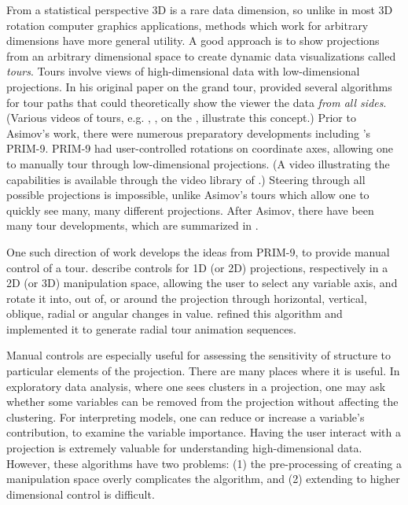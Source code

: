 \documentclass[]{interact}
\theoremstyle{plain}%
\theoremstyle{definition}
\theoremstyle{remark}
\begin{document}
From a statistical perspective 3D is a rare data dimension, so unlike in
most 3D rotation computer graphics applications, methods which work for
arbitrary dimensions have more general utility. A good approach is to
show projections from an arbitrary dimensional space to create dynamic
data visualizations called \emph{tours}. Tours involve views of
high-dimensional data with low-dimensional projections. In his original
paper on the grand tour, \citet{As85} provided several algorithms for
tour paths that could theoretically show the viewer the data \emph{from
all sides}. (Various videos of tours, e.g. \citet{dataviewer},
\citet{gt-pp-video}, on the \citet{ASA22}, illustrate this concept.)
Prior to Asimov's work, there were numerous preparatory developments
including \citet{tukey}'s PRIM-9. PRIM-9 had user-controlled rotations
on coordinate axes, allowing one to manually tour through
low-dimensional projections. (A video \citep{PRIM9-video} illustrating
the capabilities is available through the video library of
\citet{ASA22}.) Steering through all possible projections is impossible,
unlike Asimov's tours which allow one to quickly see many, many
different projections. After Asimov, there have been many tour
developments, which are summarized in \citet{lee2021}.

One such direction of work develops the ideas from PRIM-9, to provide
manual control of a tour. \citet{cook_manual_1997} describe controls for
1D (or 2D) projections, respectively in a 2D (or 3D) manipulation space,
allowing the user to select any variable axis, and rotate it into, out
of, or around the projection through horizontal, vertical, oblique,
radial or angular changes in value. \citet{spyrison_spinifex_2020}
refined this algorithm and implemented it to generate radial tour
animation sequences.

Manual controls are especially useful for assessing the sensitivity of
structure to particular elements of the projection. There are many
places where it is useful. In exploratory data analysis, where one sees
clusters in a projection, one may ask whether some variables can be
removed from the projection without affecting the clustering. For
interpreting models, one can reduce or increase a variable's
contribution, to examine the variable importance. Having the user
interact with a projection is extremely valuable for understanding
high-dimensional data. However, these algorithms have two problems: (1)
the pre-processing of creating a manipulation space overly complicates
the algorithm, and (2) extending to higher dimensional control is
difficult.
\end{document}
